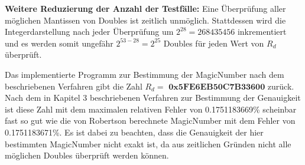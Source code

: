 \documentclass[course=erap]{aspdoc}
\begin{document}
\textbf{Weitere Reduzierung der Anzahl der Testfälle:} 
Eine Überprüfung aller möglichen Mantissen von Doubles ist zeitlich unmöglich. Stattdessen wird die Integerdarstellung nach jeder Überprüfung um $2^{28} = 268435456$ inkrementiert und es werden somit ungefähr $2^{53 - 28} = 2^{25}$ Doubles für jeden Wert von $R_d$ überprüft.\par
Das implementierte Programm zur Bestimmung der MagicNumber nach dem beschriebenen Verfahren gibt die Zahl \boldmath$R_d = \textbf{ 0x5FE6EB50C7B33600}$ \unboldmath zurück. Nach dem in Kapitel 3 beschriebenen Verfahren zur Bestimmung der Genauigkeit ist diese Zahl mit dem maximalen relativen Fehler von 0.1751183669\% scheinbar fast so gut wie die von Robertson berechnete MagicNumber mit dem Fehler von 0.1751183671\%. Es ist dabei zu beachten, dass die Genauigkeit der hier bestimmten MagicNumber nicht exakt ist, da aus zeitlichen Gründen nicht alle möglichen Doubles überprüft werden können.

\end{document}

